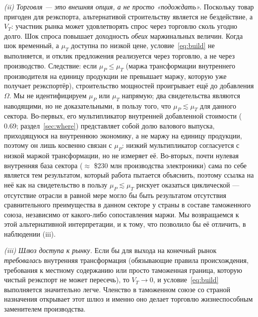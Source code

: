 \documentclass[12pt]{article}
\begin{document}
\emph{(ii) Торговля — это внешняя опция, а не просто «подождать».} Поскольку товар пригоден
для реэкспорта, альтернативой строительству является не бездействие, а $V_T$: участник рынка
может удовлетворять спрос через торговлю сколь угодно долго. Шок спроса повышает доходность
\emph{обеих} маржинальных величин. Когда шок временный, а $\mu_T$ доступна по низкой цене,
условие~\eqref{eq:build} не выполняется, и отклик предложения реализуется через торговлю, а
не через производство. Следствие: если $\mu_P \le \mu_T$ (маржа трансформации внутреннего
производителя на единицу продукции не превышает маржу, которую уже получает реэкспортёр),
строительство мощностей проигрывает ещё до добавления $\Omega$. Мы не идентифицируем
$\mu_P$ или $\mu_T$ напрямую; два свидетельства являются наводящими, но не доказательными,
в пользу того, что $\mu_P \lesssim \mu_T$ для данного сектора. Во-первых, его мультипликатор
внутренней добавленной стоимости ($0.69$; раздел~\ref{sec:where}) представляет собой долю
валового выпуска, приходящуюся на внутреннюю экономику, а не маржу на единицу продукции,
поэтому он лишь косвенно связан с $\mu_P$: низкий мультипликатор согласуется с низкой маржой
трансформации, но не измеряет её. Во-вторых, почти нулевая внутренняя база сектора
($\approx$ \$230 млн производства электроники) сама по себе является тем результатом,
который работа пытается объяснить, поэтому ссылка на неё как на свидетельство в пользу
$\mu_P \lesssim \mu_T$ рискует оказаться циклической — отсутствие отрасли в равной мере
могло бы быть результатом отсутствия сравнительного преимущества в данном секторе у страны
в составе таможенного союза, независимо от какого-либо сопоставления маржи. Мы возвращаемся
к этой альтернативной интерпретации, и к тому, что позволило бы её отличить, в
наблюдении (iii).

\emph{(iii) Шлюз доступа к рынку.} Если бы для выхода на конечный рынок \emph{требовалась}
внутренняя трансформация (обязывающие правила происхождения, требования к местному
содержанию или просто таможенная граница, которую чистый реэкспорт не может пересечь), то
$V_T \to 0$, и условие~\eqref{eq:build} выполняется значительно легче. Членство в таможенном
союзе со страной назначения открывает этот шлюз и именно оно делает торговлю жизнеспособным
заменителем производства.
\end{document}
